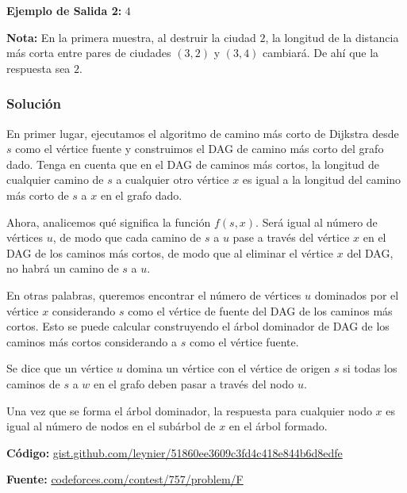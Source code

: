 \documentclass[12pt]{article}
\newcommand{\nl}{\vspace{0.3cm}}
\begin{document}
\textbf{Ejemplo de Salida 2:} $4$

\nl

\textbf{Nota:} En la primera muestra, al destruir la ciudad $2$, la longitud de la distancia más corta entre pares de ciudades $(3, 2)$ y $(3, 4)$ cambiará. De ahí que la respuesta sea $2$.

\subsubsection{Solución}

\nl

En primer lugar, ejecutamos el algoritmo de camino más corto de Dijkstra desde $s$ como el vértice fuente y construimos el DAG de camino más corto del grafo dado. Tenga en cuenta que en el DAG de caminos más cortos, la longitud de cualquier camino de $s$ a cualquier otro vértice $x$ es igual a la longitud del camino más corto de $s$ a $x$ en el grafo dado.

\nl

Ahora, analicemos qué significa la función $f(s, x)$. Será igual al número de vértices $u$, de modo que cada camino de $s$ a $u$ pase a través del vértice $x$ en el DAG de los caminos más cortos, de modo que al eliminar el vértice $x$ del DAG, no habrá un camino de $s$ a $u$.

\nl

En otras palabras, queremos encontrar el número de vértices $u$ dominados por el vértice $x$ considerando $s$ como el vértice de fuente del DAG de los caminos más cortos. Esto se puede calcular construyendo el árbol dominador de DAG de los caminos más cortos considerando a $s$ como el vértice fuente.\cite{afaffd}

\newpage

Se dice que un vértice $u$ domina un vértice con el vértice de origen $s$ si todas los caminos de $s$ a $w$ en el grafo deben pasar a través del nodo $u$.

\nl

Una vez que se forma el árbol dominador, la respuesta para cualquier nodo $x$ es igual al número de nodos en el subárbol de $x$ en el árbol formado.

\nl

\textbf{Código:} \href{https://gist.github.com/leynier/51860ee3609c3fd4c418e844b6d8edfe}{gist.github.com/leynier/51860ee3609c3fd4c418e844b6d8edfe}

\nl

\textbf{Fuente:} \href{https://codeforces.com/contest/757/problem/F}{codeforces.com/contest/757/problem/F}
\end{document}
